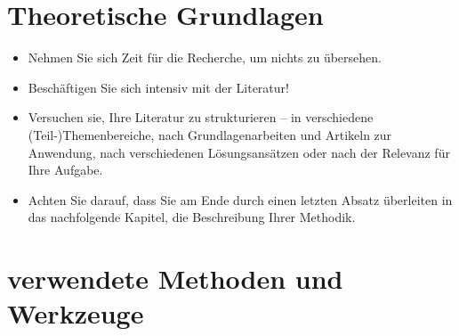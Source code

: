 \documentclass{article}
\begin{document}
\section{Theoretische Grundlagen}

\begin{itemize}
    \item Nehmen Sie sich Zeit für die Recherche, um nichts zu übersehen.
    \item Beschäftigen Sie sich intensiv mit der Literatur!
    \item Versuchen sie, Ihre Literatur zu strukturieren – in verschiedene (Teil-)Themenbereiche, nach Grundlagenarbeiten und Artikeln zur Anwendung, nach verschiedenen Lösungsansätzen oder nach der Relevanz für Ihre Aufgabe.
    \item Achten Sie darauf, dass Sie am Ende durch einen letzten Absatz überleiten in das nachfolgende Kapitel, die Beschreibung Ihrer Methodik. 
\end{itemize}

\section{verwendete Methoden und Werkzeuge}
\end{document}
